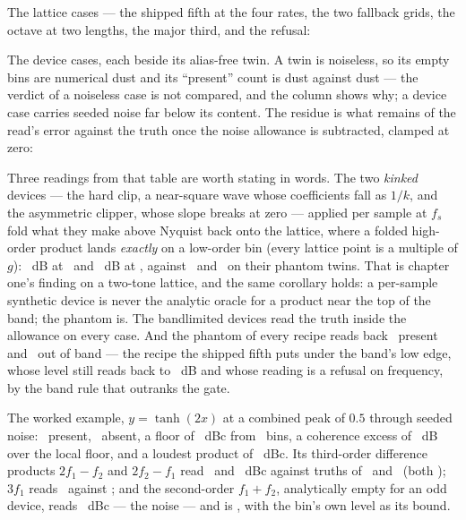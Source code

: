 \documentclass[11pt,a4paper]{article}
\begin{document}
The lattice cases --- the shipped fifth at the four rates, the two
fallback grids, the octave at two lengths, the major third, and the
refusal:

\begin{center}\scriptsize\setlength{\tabcolsep}{4pt}\iparityLatticeTable\end{center}

The device cases, each beside its alias-free twin. A twin is noiseless,
so its empty bins are numerical dust and its ``present'' count is dust
against dust --- the verdict of a noiseless case is not compared, and
the column shows why; a device case carries seeded noise far below its
content. The residue is what remains of the read's error against the truth
once the noise allowance is subtracted, clamped at zero:

\begin{center}\scriptsize\setlength{\tabcolsep}{3pt}\iparityDeviceTable\end{center}

Three readings from that table are worth stating in words. The two
\emph{kinked} devices --- the hard clip, a near-square wave whose
coefficients fall as $1/k$, and the asymmetric clipper, whose slope breaks
at zero --- applied per sample at $f_s$ fold what they make above Nyquist
back onto the lattice, where a folded high-order product lands
\emph{exactly} on a low-order bin (every lattice point is a multiple of
$g$): \iparityHardclipAlias\ dB at \iparityHardclipAliasAt\ and
\iparityAsymAlias\ dB at \iparityAsymAliasAt, against \iparityHardclipTwin\
and \iparityAsymTwin\ on their phantom twins. That is chapter one's
finding on a two-tone lattice, and the same corollary holds: a per-sample
synthetic device is never the analytic oracle for a product near the top
of the band; the phantom is. The bandlimited devices read the truth inside
the allowance on every case. And the phantom of every recipe reads back
\iparityPhantomPresent\ present and \iparityPhantomOutOfBand\ out of band
--- the recipe the shipped fifth puts under the band's low edge, whose
level still reads back to \iparityPhantomWorst\ dB and whose reading is a
refusal on frequency, by the band rule that outranks the gate.

The worked example, $y = \tanh(2x)$ at a combined peak of $0.5$ through
seeded noise: \iparityWorkedPresent\ present, \iparityWorkedAbsent\ absent,
a floor of \iparityWorkedFloor\ dBc from \iparityWorkedFloorBins\ bins, a
coherence excess of \iparityWorkedCoherenceExcess\ dB over the local
floor, and a loudest product of \iparityWorkedLoudest\ dBc. Its third-order
difference products $2f_1 - f_2$ and $2f_2 - f_1$ read
\iparityWorkedTwoFOneMinusFTwoLevel\ and \iparityWorkedTwoFTwoMinusFOneLevel\
dBc against truths of \iparityWorkedTwoFOneMinusFTwoTruth\ and
\iparityWorkedTwoFTwoMinusFOneTruth\ (both
\iparityWorkedTwoFOneMinusFTwoReading); $3f_1$ reads
\iparityWorkedThreeFOneLevel\ against \iparityWorkedThreeFOneTruth; and
the second-order $f_1 + f_2$, analytically empty for an odd device, reads
\iparityWorkedFOnePlusFTwoLevel\ dBc --- the noise --- and is
\iparityWorkedFOnePlusFTwoReading, with the bin's own level as its bound.
\end{document}
